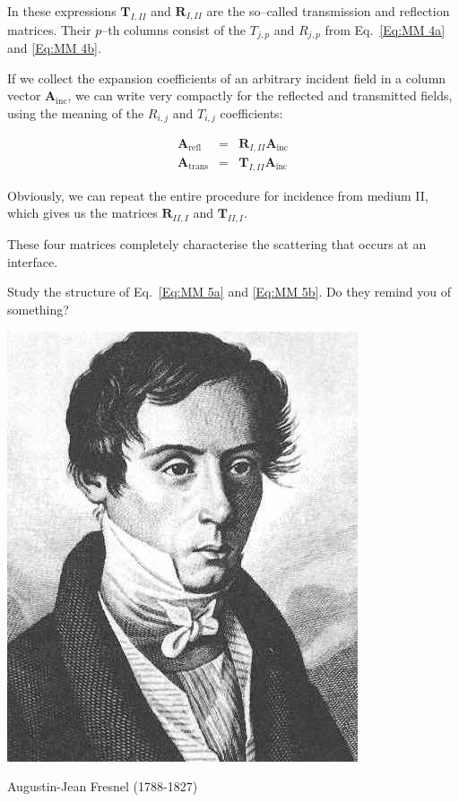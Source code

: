 In these expressions $\mathbf{T}_{I,II}$ and $\mathbf{R}_{I,II}$ are the so--called transmission and reflection matrices. Their \( p \)--th columns consist of the $T_{j,p}$ and $R_{j,p}$ from Eq.~\ref{Eq:MM 4a} and \ref{Eq:MM 4b}. 

If we collect the expansion coefficients of an arbitrary incident field in a column vector $\mathbf{A}_\mathrm{inc}$, we can write very compactly for the reflected and transmitted fields, using the meaning of the $R_{i,j}$ and $T_{i,j}$ coefficients: 

\begin{eqnarray}
\mathbf{A}_\textrm{refl} & = & \mathbf{R}_{I,II} \mathbf{A}_\textrm{inc}\label{Eq:R matrix} \\
\mathbf{A}_\textrm{trans} & = & \mathbf{T}_{I,II} \mathbf{A}_\textrm{inc}\label{Eq:T matrix} 
\end{eqnarray}

Obviously, we can repeat the entire procedure for incidence from medium II, which gives us the matrices $\mathbf{R}_{II,I}$ and $\mathbf{T}_{II,I}$.

These four matrices completely characterise the scattering that occurs at an interface.

\begin{cue}
Study the structure of Eq.~\ref{Eq:MM 5a} and \ref{Eq:MM 5b}. Do they remind you of something?  
\end{cue}

\begin{marginfigure}[-5.0cm]
  \includegraphics{numeric/figures/a_fresnel}
  \caption{Augustin-Jean Fresnel (1788-1827)}
\end{marginfigure}

